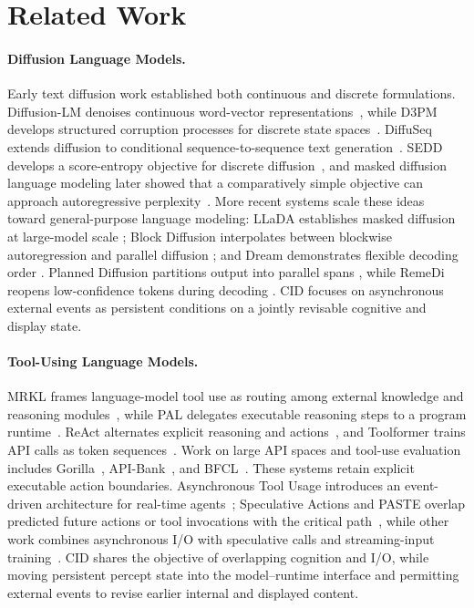 \section{Related Work}
\label{sec:related-work}

\paragraph{Diffusion Language Models.}
Early text diffusion work established both continuous and discrete formulations. Diffusion-LM denoises continuous word-vector representations~\citep{li2022diffusionlm}, while D3PM develops structured corruption processes for discrete state spaces~\citep{austin2021d3pm}. DiffuSeq extends diffusion to conditional sequence-to-sequence text generation~\citep{gong2022diffuseq}. SEDD develops a score-entropy objective for discrete diffusion~\citep{lou2024sedd}, and masked diffusion language modeling later showed that a comparatively simple objective can approach autoregressive perplexity~\citep{sahoo2024mdlm}. More recent systems scale these ideas toward general-purpose language modeling: LLaDA establishes masked diffusion at large-model scale \citep{nie2025llada}; Block Diffusion interpolates between blockwise autoregression and parallel diffusion \citep{arriola2025blockdiffusion}; and Dream demonstrates flexible decoding order \citep{ye2025dream}. Planned Diffusion partitions output into parallel spans \citep{israel2025planned}, while RemeDi reopens low-confidence tokens during decoding \citep{huang2025remedi}. CID focuses on asynchronous external events as persistent conditions on a jointly revisable cognitive and display state.

\paragraph{Tool-Using Language Models.}
MRKL frames language-model tool use as routing among external knowledge and reasoning modules~\citep{karpas2022mrkl}, while PAL delegates executable reasoning steps to a program runtime~\citep{gao2023pal}. ReAct alternates explicit reasoning and actions~\citep{yao2022react}, and Toolformer trains API calls as token sequences~\citep{schick2023toolformer}. Work on large API spaces and tool-use evaluation includes Gorilla~\citep{patil2024gorilla}, API-Bank~\citep{li2023apibank}, and BFCL~\citep{patil2025bfcl}. These systems retain explicit executable action boundaries. Asynchronous Tool Usage introduces an event-driven architecture for real-time agents~\citep{ginart2024asynchronous}; Speculative Actions and PASTE overlap predicted future actions or tool invocations with the critical path~\citep{ye2026speculativeactions,sui2026paste}, while other work combines asynchronous I/O with speculative calls and streaming-input training~\citep{hooper2026realtime}. CID shares the objective of overlapping cognition and I/O, while moving persistent percept state into the model--runtime interface and permitting external events to revise earlier internal and displayed content.

